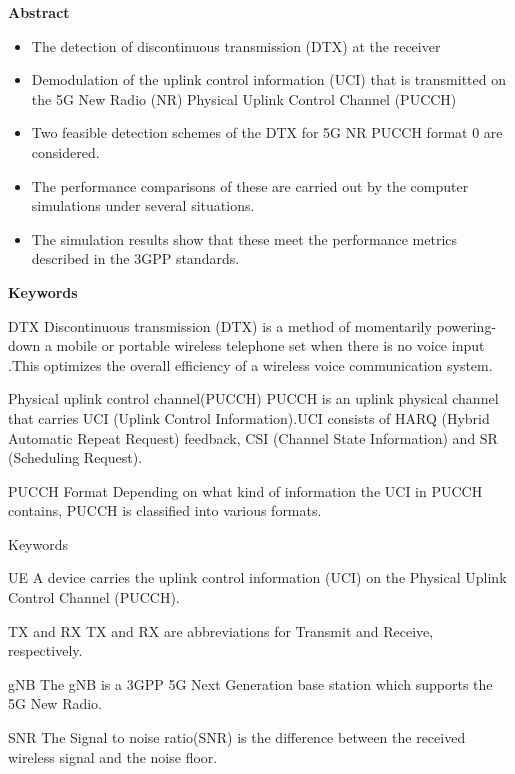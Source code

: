 \documentclass{beamer}
\begin{document}
\begin{frame}{\textbf{Abstract}}
    \begin{itemize}
    \item  The detection of discontinuous transmission (DTX) at the receiver
    \item  Demodulation of the uplink control information (UCI) that is transmitted on the 5G New Radio (NR) Physical Uplink Control Channel (PUCCH)
    \item Two feasible detection schemes of the DTX for 5G NR PUCCH format 0 are considered.
    \item The performance comparisons of
     these are carried out by the computer simulations under several situations.
     \item  The simulation results show that these meet the performance metrics described in the 3GPP standards.
    \end{itemize}
\end{frame}
\begin{frame}{\textbf{Keywords}}
    \begin{block}{DTX}
    Discontinuous transmission (DTX) is a method of momentarily powering-down a mobile or portable wireless telephone set when there is no voice input .This optimizes the overall efficiency of a wireless voice communication system.
    \end{block}
    \begin{block}{Physical uplink control channel(PUCCH)}
     PUCCH is an uplink physical channel that carries UCI (Uplink Control Information).UCI consists of HARQ (Hybrid Automatic Repeat Request) feedback, CSI (Channel State Information) and SR (Scheduling Request).
    \end{block}
    \begin{block}{PUCCH Format}
    Depending on what kind of information the UCI in PUCCH contains, PUCCH is classified into various formats.
    \end{block}
\end{frame}
\begin{frame}{Keywords}
\begin{block}{UE}
A device carries the uplink control information (UCI) on the Physical Uplink Control Channel (PUCCH).
\end{block}
\begin{block}{TX and RX}
TX and RX are abbreviations for Transmit and Receive, respectively.
\end{block}
\begin{block}{gNB}
The gNB is a 3GPP 5G Next Generation base station which supports the 5G New Radio.
\end{block}
\begin{block}{SNR}
The Signal to noise ratio(SNR) is the difference between the received wireless signal and the noise floor.
\end{block}
    
\end{frame}
\end{document}
